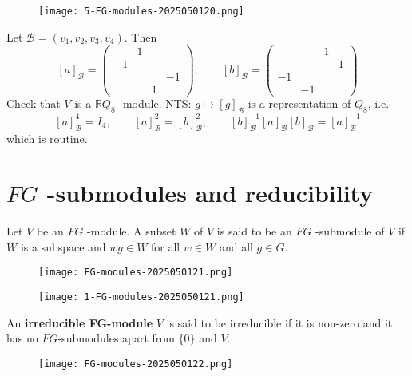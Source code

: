 \begin{exercise}
\begin{figure}[H]
\centering
\texttt{[image: 5-FG-modules-2025050120.png]}
\label{}
\end{figure}
\end{exercise}
Let $\mathscr{B}=(v_1,v_2,v_3,v_4)$. Then
\[
[a]_{\mathscr{B}}=\begin{pmatrix}
 & 1 &  &  \\
-1 &  &  &  \\
 &  &  & -1  \\
 &  & 1 & 
\end{pmatrix},\qquad [b]_{\mathscr{B}}=\begin{pmatrix}
 &  & 1 &  \\
 &  &  & 1  \\
-1 &  &  &  \\
 & -1 &  & 
\end{pmatrix}
\]
Check that $V$ is a $\mathbb{R}Q_8$ -module. NTS: $g\mapsto[g]_{\mathscr{B}}$ is a representation of $Q_8$, i.e.
\[
[a]_{\mathscr{B}}^{4}=I_4,\qquad [a]_{\mathscr{B}}^2=[b]_{\mathscr{B}}^2,\qquad [b]_{\mathscr{B}}^{-1}[a]_{\mathscr{B}}[b]_{\mathscr{B}}=[a]_{\mathscr{B}}^{-1}
\]
which is routine.


\section{\texorpdfstring{$FG$}{FG} -submodules and reducibility}

\begin{definition}[$FG$ -submodule]
Let $V$ be an $F G$ -module. A subset $W$ of $V$ is said to be an $F G$ -submodule of $V$ if $W$ is a subspace and $w g \in W$ for all $w \in W$ and all $g \in G$.
\end{definition}
\begin{figure}[H]
\centering
\texttt{[image: FG-modules-2025050121.png]}
\label{}
\end{figure}
\begin{figure}[H]
\centering
\texttt{[image: 1-FG-modules-2025050121.png]}
\label{}
\end{figure}

\begin{definition}
An \textbf{irreducible FG-module} $V$ is said to be irreducible if it is non-zero and it has no $F G$-submodules apart from $\{0\}$ and $V$.
\end{definition}
\begin{figure}[H]
\centering
\texttt{[image: FG-modules-2025050122.png]}
\label{}
\end{figure}

